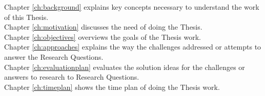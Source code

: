 \noindent Chapter \ref{ch:background} explains key concepts necessary to understand the work of this Thesis. \\ 
Chapter \ref{ch:motivation} discusses the need of doing the Thesis. \\
Chapter \ref{ch:objectives} overviews the goals of the Thesis work. \\
Chapter \ref{ch:approaches} explains the way the challenges addressed or attempts to answer the Research Questions. \\
Chapter \ref{ch:evaluationplan} evaluates the solution ideas for the challenges or answers to research to Research Questions. \\
Chapter \ref{ch:timeplan} shows the time plan of doing the Thesis work. \\ \\


\let\cleardoublepage\clearpage
